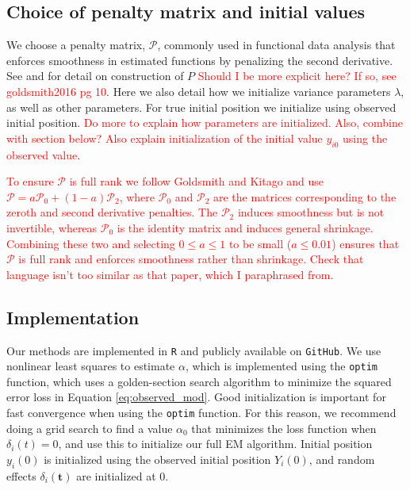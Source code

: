 \documentclass[preprint]{JASA}
\begin{document}
\hypertarget{choice-of-penalty-matrix-and-initial-values}{%
\subsection{Choice of penalty matrix and initial
values}\label{choice-of-penalty-matrix-and-initial-values}}

We choose a penalty matrix, \(\mathcal{P}\), commonly used in functional
data analysis that enforces smoothness in estimated functions by
penalizing the second derivative. See \cite{eilers1996} and
\cite{goldsmith2016} for detail on construction of \(P\)
\textcolor{red}{Should I be more explicit here? If so, see goldsmith2016 pg 10}.
Here we also detail how we initialize variance parameters \(\lambda\),
as well as other parameters. For true initial position we initialize
using observed initial position.
\textcolor{red}{Do more to explain how parameters are initialized. Also, combine with section below? Also explain initialization of the initial value $y_{i0}$ using the observed value}.

\textcolor{red}{
To ensure $\mathcal{P}$ is full rank we follow Goldsmith and Kitago and use $\mathcal{P} = a\mathcal{P}_0 + (1-a)\mathcal{P}_2$, where $\mathcal{P}_0$ and $\mathcal{P}_2$ are the matrices corresponding to the zeroth and second derivative penalties.  The $\mathcal{P}_2$ induces smoothness but is not invertible, whereas $\mathcal{P}_0$ is the identity matrix and induces general shrinkage. Combining these two and selecting $0\le a \le 1$ to be small ($a \le 0.01$) ensures that $\mathcal{P}$ is full rank and enforces smoothness rather than shrinkage. Check that language isn't too similar as that paper, which I paraphrased from.
}

\hypertarget{implementation}{%
\subsection{Implementation}\label{implementation}}

Our methods are implemented in \texttt{R} and publicly available on
\texttt{GitHub}. We use nonlinear least squares to estimate \(\alpha\),
which is implemented using the \texttt{optim} function, which uses a
golden-section search algorithm to minimize the squared error loss in
Equation \ref{eq:observed_mod}. Good initialization is important for
fast convergence when using the \texttt{optim} function. For this
reason, we recommend doing a grid search to find a value \(\alpha_0\)
that minimizes the loss function when \(\delta_i(t) = 0\), and use this
to initialize our full EM algorithm. Initial position \(y_i(0)\) is
initialized using the observed initial position \(Y_i(0)\), and random
effects \(\delta_i(\mathbf{t})\) are initialized at 0.
\end{document}
